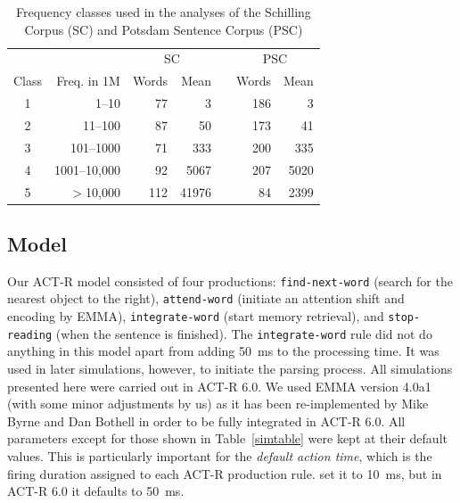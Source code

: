 \begin{table}[!htbp]
\centering
\begin{tabular}{crrrrrr} 
\hline
  &  & \multicolumn{2}{c}{SC} & & \multicolumn{2}{c}{PSC} \\ \cline{3-4} \cline{6-7}
  Class & Freq. in 1M & Words & Mean & & Words & Mean   \\ 
\hline
  1     & 1--10   & 77  & 3     & & 186 & 3         \\
  2     &  11--100 & 87  & 50    & & 173 & 41        \\
  3     &  101--1000 & 71  & 333   & & 200 & 335       \\
  4     &  1001--10,000 & 92  & 5067  & & 207 & 5020      \\
  5     &  $>$10,000  & 112 & 41976 & & 84  & 2399      \\ 
\hline
\end{tabular}
\caption{Frequency classes used in the analyses of the Schilling Corpus (SC) and Potsdam Sentence Corpus (PSC)}
\label{classtable}
\end{table}

\subsection{Model}
Our ACT-R model consisted of four productions:  \texttt{find-next-word} (search for the nearest object to the right),  \texttt{attend-word} (initiate an attention shift and encoding by EMMA),  \texttt{integrate-word} (start memory retrieval), and  \texttt{stop-reading} (when the sentence is finished).  The \texttt{integrate-word} rule did not do anything in this model apart from adding 50~ms to the processing time. It was used in later simulations, however, to initiate the parsing process.
All simulations presented here were carried out in ACT-R 6.0. We used EMMA version 4.0a1 (with some minor adjustments by us) as it has been re-implemented by Mike Byrne and Dan Bothell in order to be fully integrated in ACT-R 6.0.  All parameters except for those shown in Table~\ref{simtable} were kept at their default values.  This is particularly important for the \emph{default action time}, which is the firing duration assigned to each ACT-R production rule. \cite{Salvucci2001} set it to 10~ms, but in ACT-R 6.0 it defaults to 50~ms.

